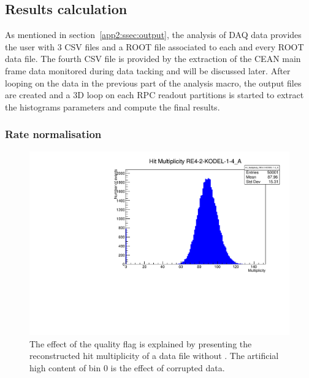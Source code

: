 	\subsection{Results calculation}
	\label{app2:ssec:rate}
		
	As mentioned in section~\ref{app2:ssec:output}, the analysis of DAQ data provides the user with 3 CSV files and a ROOT file associated to each and every ROOT data file. The fourth CSV file is provided by the extraction of the CEAN main frame data monitored during data tacking and will be discussed later. After looping on the data in the previous part of the analysis macro, the output files are created and a 3D loop on each RPC readout partitions is started to extract the histograms parameters and compute the final results.\\
	
		\subsubsection{Rate normalisation}
		\label{app2:sssec:norm}
	
	\begin{figure}[H]
        \centering
		\includegraphics[width = 0.7\linewidth]{fig/app1/No_Qflag_nhits_KODEL.pdf}
		\caption{\label{fig:corrupted} The effect of the quality flag is explained by presenting the reconstructed hit multiplicity of a data file without . The artificial high content of bin 0 is the effect of corrupted data.}
	\end{figure}
	
